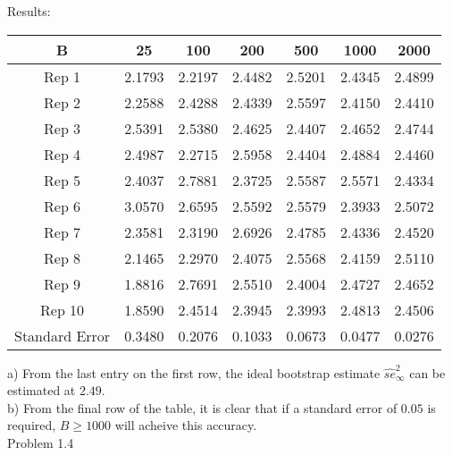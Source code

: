 \documentclass[10pt]{article}
\begin{document}
Results:\\
\begin{center}
\begin{tabular}{|c|cccccc|}
\hline
B & 25& 100 & 200&500 & 1000 & 2000 \\ \hline
Rep 1 &  2.1793 &  2.2197 &  2.4482 &  2.5201 &  2.4345 &  2.4899 \\
Rep 2 & 2.2588   & 2.4288 &   2.4339 &   2.5597 &   2.4150 & 2.4410 \\
Rep 3 & 2.5391   &2.5380 &  2.4625 &  2.4407 &  2.4652 &   2.4744\\
Rep 4 & 2.4987  & 2.2715 &   2.5958 &   2.4404 &   2.4884 &   2.4460\\
Rep 5 & 2.4037 &  2.7881  &  2.3725 &   2.5587 &   2.5571 &   2.4334\\
Rep 6 & 3.0570   & 2.6595&    2.5592 &   2.5579  &  2.3933  & 2.5072\\
Rep 7 & 2.3581 & 2.3190 & 2.6926 & 2.4785 & 2.4336   & 2.4520\\
Rep 8 & 2.1465 &  2.2970 & 2.4075 & 2.5568 & 2.4159 & 2.5110\\
Rep 9 & 1.8816 &  2.7691 &  2.5510 &  2.4004 &  2.4727 &  2.4652\\
Rep 10 & 1.8590 &  2.4514 &  2.3945 &  2.3993 &  2.4813 &  2.4506\\ \hline
Standard Error & 0.3480 & 0.2076 & 0.1033 & 0.0673 &0.0477 &0.0276\\
\hline
\end{tabular}
\end{center}
a) From the last entry on the first row, the ideal bootstrap estimate $\widehat{se}_{\infty}^2$ can be estimated at $2.49$. \\
b) From the final row of the table, it is clear that if a standard error of $0.05$ is required, $B \geq 1000$ will acheive this accuracy. \\

Problem 1.4\\
\end{document}
